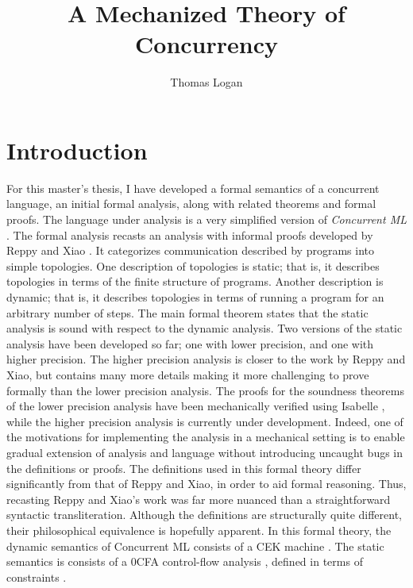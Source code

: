\documentclass[10pt]{article}
\title{A Mechanized Theory of Concurrency}
\author{Thomas Logan}
\begin{document}
\maketitle
{}

\newpage
{}


\section{Introduction}
For this master's thesis, I have developed a formal semantics of
a concurrent language, an initial formal analysis, along with related theorems and formal 
proofs. The language under analysis is
a very simplified version of \textit{Concurrent ML} \cite{reppy2007concurrent}. The formal analysis
recasts an analysis with informal proofs developed by Reppy and Xiao \cite{reppy2007specialization}. It
categorizes communication described by programs into simple topologies. One description of
topologies is static; that is, it describes topologies in terms of the finite structure of
programs.  Another description is dynamic; that is, it describes topologies in terms of running
a program for an arbitrary number of steps. The main formal theorem states that the static
analysis is sound with respect to the dynamic analysis. Two versions of the static analysis
have been developed so far; one with lower precision, and one with higher precision. The higher
precision analysis is closer to the work by Reppy and Xiao, but contains many more details making
it more challenging to prove formally than the lower precision analysis.
The proofs for the soundness theorems of the lower precision analysis
have been mechanically verified using Isabelle \cite{nipkow2002isabelle}, while the higher precision
analysis is currently under development. Indeed, one of the motivations for implementing the analysis 
in a mechanical setting is to enable gradual extension of analysis and language without introducing
uncaught bugs in the definitions or proofs. The definitions used in this formal theory differ
significantly from that of Reppy and Xiao, in order to aid formal reasoning. Thus, recasting
Reppy and Xiao's work was far more nuanced than a straightforward
syntactic transliteration.
Although the definitions are structurally quite different,
their philosophical equivalence is hopefully apparent. 
In this formal theory, the dynamic semantics of Concurrent ML consists of 
a CEK machine \cite{felleisen1986control}. The static semantics is consists of a 0CFA control-flow analysis
\cite{shivers1991control}, defined in terms of constraints \cite{nielson2015principles}.
\end{document}
